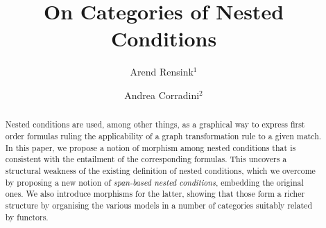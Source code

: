 \title{On Categories of Nested Conditions}

\author{Arend Rensink$^1$ \and Andrea Corradini$^2$}

\maketitle

\begin{abstract}
Nested conditions are used, among other things, as a graphical way to express first order formulas ruling the applicability of a graph transformation rule to a given match. In this paper, we propose a notion of morphism among nested conditions that is consistent with the entailment of the corresponding formulas. This uncovers a structural weakness of the existing definition of nested conditions, which we overcome by proposing a new notion of \emph{span-based nested conditions}, embedding the original ones. We also introduce morphisms for the latter, showing that those form a richer structure by organising the various models in a number of categories suitably related by functors.
\end{abstract}
